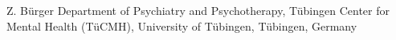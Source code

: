 
                {Z. Bürger}
                {Department of Psychiatry and Psychotherapy, Tübingen Center for Mental Health (TüCMH), University of Tübingen, Tübingen, Germany}
                
